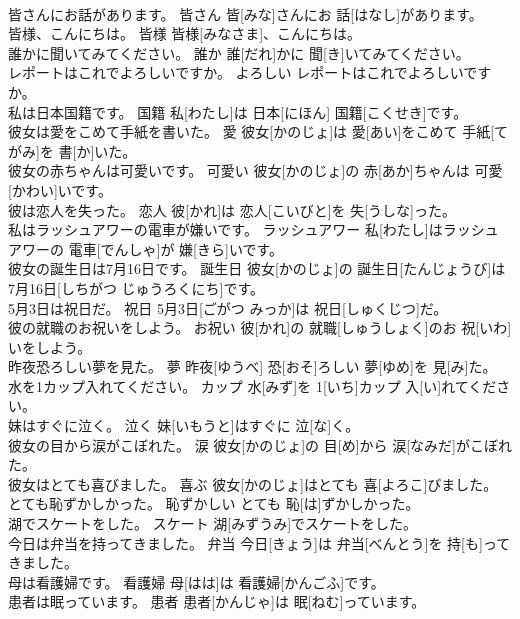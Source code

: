 \documentclass[8pt]{extreport}
\begin{document}
\begin{CJK}{UTF8}{min}
\\	皆さんにお話があります。	皆さん	皆[みな]さんにお 話[はなし]があります。	
\\	皆様、こんにちは。	皆様	皆様[みなさま]、こんにちは。	
\\	誰かに聞いてみてください。	誰か	誰[だれ]かに 聞[き]いてみてください。	
\\	レポートはこれでよろしいですか。	よろしい	レポートはこれでよろしいですか。	
\\	私は日本国籍です。	国籍	私[わたし]は 日本[にほん] 国籍[こくせき]です。	
\\	彼女は愛をこめて手紙を書いた。	愛	彼女[かのじょ]は 愛[あい]をこめて 手紙[てがみ]を 書[か]いた。	
\\	彼女の赤ちゃんは可愛いです。	可愛い	彼女[かのじょ]の 赤[あか]ちゃんは 可愛[かわい]いです。	
\\	彼は恋人を失った。	恋人	彼[かれ]は 恋人[こいびと]を 失[うしな]った。	
\\	私はラッシュアワーの電車が嫌いです。	ラッシュアワー	私[わたし]はラッシュアワーの 電車[でんしゃ]が 嫌[きら]いです。	
\\	彼女の誕生日は7月16日です。	誕生日	彼女[かのじょ]の 誕生日[たんじょうび]は 7月16日[しちがつ じゅうろくにち]です。	
\\	5月3日は祝日だ。	祝日	5月3日[ごがつ みっか]は 祝日[しゅくじつ]だ。	
\\	彼の就職のお祝いをしよう。	お祝い	彼[かれ]の 就職[しゅうしょく]のお 祝[いわ]いをしよう。	
\\	昨夜恐ろしい夢を見た。	夢	昨夜[ゆうべ] 恐[おそ]ろしい 夢[ゆめ]を 見[み]た。	
\\	水を1カップ入れてください。	カップ	水[みず]を 1[いち]カップ 入[い]れてください。	
\\	妹はすぐに泣く。	泣く	妹[いもうと]はすぐに 泣[な]く。	
\\	彼女の目から涙がこぼれた。	涙	彼女[かのじょ]の 目[め]から 涙[なみだ]がこぼれた。	
\\	彼女はとても喜びました。	喜ぶ	彼女[かのじょ]はとても 喜[よろこ]びました。	
\\	とても恥ずかしかった。	恥ずかしい	とても 恥[は]ずかしかった。	
\\	湖でスケートをした。	スケート	湖[みずうみ]でスケートをした。	
\\	今日は弁当を持ってきました。	弁当	今日[きょう]は 弁当[べんとう]を 持[も]ってきました。	
\\	母は看護婦です。	看護婦	母[はは]は 看護婦[かんごふ]です。	
\\	患者は眠っています。	患者	患者[かんじゃ]は 眠[ねむ]っています。	

\end{CJK}
\end{document}
